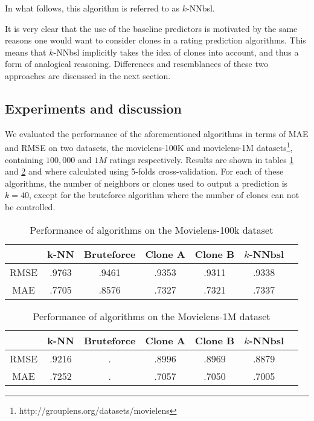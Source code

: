 \documentclass[conference]{IEEEtran}
\begin{document}
In what follows, this algorithm is referred to as $k$-NNbsl.

It is very clear that the use of the baseline predictors is motivated by the
same reasons one would want to consider clones in a rating prediction
algorithms. This means that $k$-NNbsl implicitly takes the idea of clones into account, and thus a form of analogical reasoning.
Differences and resemblances of these two approaches are discussed
in the next section.

\subsection{Experiments and discussion}
\label{expeDiscuss}

We evaluated the performance of the aforementioned algorithms in terms of MAE
and RMSE on two datasets, the movielens-100K and movielens-1M
datasets\footnote{http://grouplens.org/datasets/movielens}, containing
$100,000$ and $1M$ ratings respectively. Results are shown in tables
\ref{table:res100k} and \ref{table:res1M} and where calculated using 5-folds
cross-validation. For each of these algorithms, the number of neighbors or
clones used to output a prediction is $k = 40$, except for the bruteforce
algorithm where the number of clones can not be controlled.
\begin{table}[!ht]
\centering
\caption{Performance of algorithms on the Movielens-100k dataset}
\label{table:res100k}
\begin{tabular}{| c || c | c | c | c | c | c |}
\toprule
     &  k-NN & Bruteforce & Clone A & Clone B & $k$-NNbsl\\
\midrule
RMSE & .9763 &   .9461    &   .9353 &  .9311  &  .9338   \\
MAE  & .7705 &   .8576    &   .7327 &  .7321  &  .7337   \\
\bottomrule
\end{tabular}
\end{table}

\begin{table}[!ht]
\centering
\caption{Performance of algorithms on the Movielens-1M dataset}
\label{table:res1M}
\begin{tabular}{| c || c | c | c | c | c | c |}
  \toprule
     &  k-NN & Bruteforce & Clone A & Clone B & $k$-NNbsl\\
  \midrule
RMSE & .9216 &           .&   .8996 &  .8969  &  .8879\\
MAE  & .7252 &           .&   .7057 &  .7050  &  .7005\\
\bottomrule
\end{tabular}
\end{table}
\end{document}

